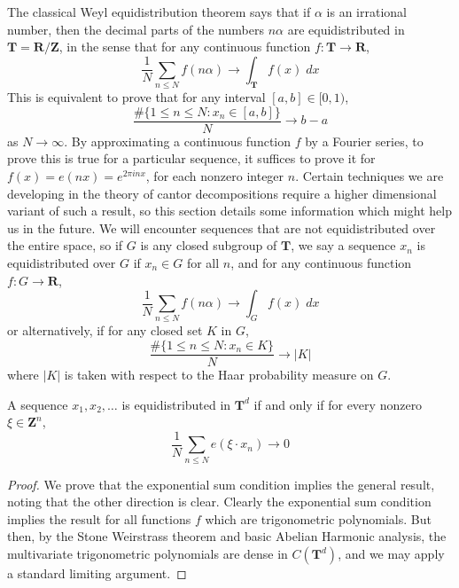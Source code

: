 The classical Weyl equidistribution theorem says that if $\alpha$ is an irrational number, then the decimal parts of the numbers $n \alpha$ are equidistributed in $\mathbf{T} = \mathbf{R}/\mathbf{Z}$, in the sense that for any continuous function $f: \mathbf{T} \to \mathbf{R}$,
%
\[ \frac{1}{N} \sum_{n \leq N} f(n \alpha) \to \int_{\mathbf{T}} f(x)\; dx \]
%
This is equivalent to prove that for any interval $[a,b] \in [0,1)$,
%
\[ \frac{\# \{ 1 \leq n \leq N : x_n \in [a,b] \}}{N} \to b - a \]
%
as $N \to \infty$. By approximating a continuous function $f$ by a Fourier series, to prove this is true for a particular sequence, it suffices to prove it for $f(x) = e(nx) = e^{2 \pi i n x}$, for each nonzero integer $n$. Certain techniques we are developing in the theory of cantor decompositions require a higher dimensional variant of such a result, so this section details some information which might help us in the future. We will encounter sequences that are not equidistributed over the entire space, so if $G$ is any closed subgroup of $\mathbf{T}$, we say a sequence $x_n$ is equidistributed over $G$ if $x_n \in G$ for all $n$, and for any continuous function $f: G \to \mathbf{R}$,
%
\[ \frac{1}{N} \sum_{n \leq N} f(n \alpha) \to \int_G f(x)\; dx \]
%
or alternatively, if for any closed set $K$ in $G$,
%
\[ \frac{\# \{ 1 \leq n \leq N: x_n \in K \}}{N} \to |K| \]
%
where $|K|$ is taken with respect to the Haar probability measure on $G$.

\begin{theorem}
    A sequence $x_1, x_2, \dots$ is equidistributed in $\mathbf{T}^d$ if and only if for every nonzero $\xi \in \mathbf{Z}^n$,
    \[ \frac{1}{N} \sum_{n \leq N} e(\xi \cdot x_n) \to 0 \]
\end{theorem}
\begin{proof}
    We prove that the exponential sum condition implies the general result, noting that the other direction is clear. Clearly the exponential sum condition implies the result for all functions $f$ which are trigonometric polynomials. But then, by the Stone Weirstrass theorem and basic Abelian Harmonic analysis, the multivariate trigonometric polynomials are dense in $C(\mathbf{T}^d)$, and we may apply a standard limiting argument.
\end{proof}

